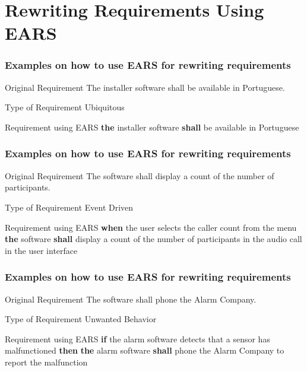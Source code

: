 \documentclass[aspectratio=169]{beamer}
\newcommand{\earsu}[2]{{\bf \color{mypurple}the} {#1} {\bf \color{mypurple}shall} {#2}}
\newcommand{\earse}[3]{{\bf \color{mygreen}when} {#1} {\bf \color{mypurple}the} {#2} {\bf \color{mypurple}shall} {#3}}
\newcommand{\earsw}[3]{{\bf \color{mygreen}if} {#1} {\bf \color{mygreen}then} {\bf \color{mypurple}the} {#2} {\bf \color{mypurple}shall} {#3}}
\begin{document}
\section*{Rewriting Requirements Using EARS}

\begin{frame}
  \frametitle{Examples on how to use EARS for rewriting requirements}
  \begin{block}{Original Requirement}
    The installer software shall be available in Portuguese.
  \end{block}
  \begin{block}{Type of Requirement}
  Ubiquitous  
  \end{block}
  \begin{block}{Requirement using EARS}
    \earsu{installer software}{be available in Portuguese}
  \end{block}
\end{frame}

\begin{frame}
  \frametitle{Examples on how to use EARS for rewriting requirements}
  \begin{block}{Original Requirement}
    The software shall display a count of the number of participants.
  \end{block}
  \begin{block}{Type of Requirement}
  Event Driven 
  \end{block}
  \begin{block}{Requirement using EARS}
    \earse{the user selects the caller count from the menu}{software}{display a count of the number of participants in the audio call in the user interface}
  \end{block}
\end{frame}

\begin{frame}
  \frametitle{Examples on how to use EARS for rewriting requirements}
  \begin{block}{Original Requirement}
    The software shall phone the Alarm Company.
  \end{block}
  \begin{block}{Type of Requirement}
  Unwanted Behavior 
  \end{block}
  \begin{block}{Requirement using EARS}
    \earsw{the alarm software detects that a sensor has malfunctioned}{alarm software}{phone the Alarm Company to report the malfunction}   
  \end{block}
\end{frame}
\end{document}
